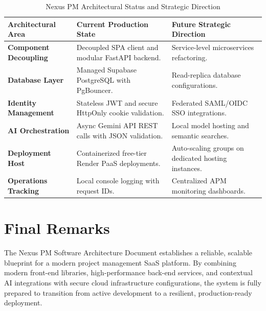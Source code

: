 \begin{table}[h!]
\centering
\small
\renewcommand{\arraystretch}{1.4}
\begin{tabularx}{\textwidth}{l X X}
    \toprule[1.5pt]
    \rowcolor{primary!5}
    \textbf{\color{primary}Architectural Area} & \textbf{\color{primary}Current Production State} & \textbf{\color{primary}Future Strategic Direction} \\
    \midrule
    \textbf{Component Decoupling} & Decoupled SPA client and modular FastAPI backend. & Service-level microservices refactoring. \\
    \textbf{Database Layer} & Managed Supabase PostgreSQL with PgBouncer. & Read-replica database configurations. \\
    \textbf{Identity Management} & Stateless JWT and secure HttpOnly cookie validation. & Federated SAML/OIDC SSO integrations. \\
    \textbf{AI Orchestration} & Async Gemini API REST calls with JSON validation. & Local model hosting and semantic searches. \\
    \textbf{Deployment Host} & Containerized free-tier Render PaaS deployments. & Auto-scaling groups on dedicated hosting instances. \\
    \textbf{Operations Tracking} & Local console logging with request IDs. & Centralized APM monitoring dashboards. \\
    \bottomrule[1.5pt]
\end{tabularx}
\caption{Nexus PM Architectural Status and Strategic Direction}
\label{tab:conclusion_summary}
\end{table}

\section{Final Remarks}
The Nexus PM Software Architecture Document establishes a reliable, scalable blueprint for a modern project management SaaS platform. By combining modern front-end libraries, high-performance back-end services, and contextual AI integrations with secure cloud infrastructure configurations, the system is fully prepared to transition from active development to a resilient, production-ready deployment.
